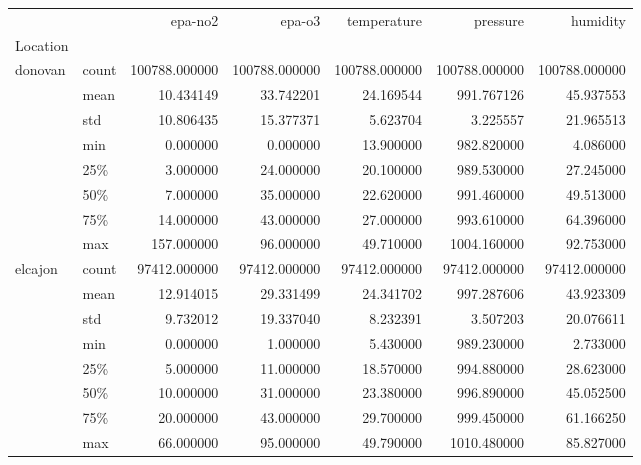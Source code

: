 \begin{tabular}{llrrrrr}
\toprule
        &       &        epa-no2 &         epa-o3 &    temperature &       pressure &       humidity \\
Location & {} &                &                &                &                &                \\
\midrule
donovan & count &  100788.000000 &  100788.000000 &  100788.000000 &  100788.000000 &  100788.000000 \\
        & mean &      10.434149 &      33.742201 &      24.169544 &     991.767126 &      45.937553 \\
        & std &      10.806435 &      15.377371 &       5.623704 &       3.225557 &      21.965513 \\
        & min &       0.000000 &       0.000000 &      13.900000 &     982.820000 &       4.086000 \\
        & 25\% &       3.000000 &      24.000000 &      20.100000 &     989.530000 &      27.245000 \\
        & 50\% &       7.000000 &      35.000000 &      22.620000 &     991.460000 &      49.513000 \\
        & 75\% &      14.000000 &      43.000000 &      27.000000 &     993.610000 &      64.396000 \\
        & max &     157.000000 &      96.000000 &      49.710000 &    1004.160000 &      92.753000 \\
elcajon & count &   97412.000000 &   97412.000000 &   97412.000000 &   97412.000000 &   97412.000000 \\
        & mean &      12.914015 &      29.331499 &      24.341702 &     997.287606 &      43.923309 \\
        & std &       9.732012 &      19.337040 &       8.232391 &       3.507203 &      20.076611 \\
        & min &       0.000000 &       1.000000 &       5.430000 &     989.230000 &       2.733000 \\
        & 25\% &       5.000000 &      11.000000 &      18.570000 &     994.880000 &      28.623000 \\
        & 50\% &      10.000000 &      31.000000 &      23.380000 &     996.890000 &      45.052500 \\
        & 75\% &      20.000000 &      43.000000 &      29.700000 &     999.450000 &      61.166250 \\
        & max &      66.000000 &      95.000000 &      49.790000 &    1010.480000 &      85.827000 \\

\end{tabular}
